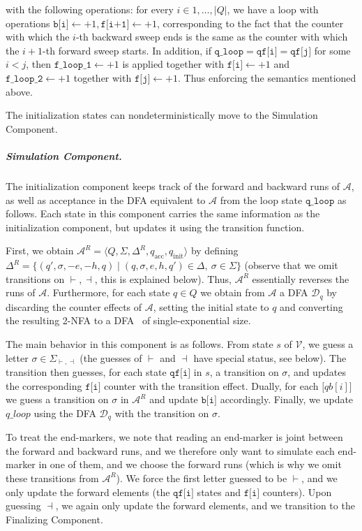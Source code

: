 \documentclass[11pt,a4paper]{amsart}
\theoremstyle{definition}
\newcommand{\tup}[1]{\langle #1 \rangle}
\newcommand{\lmark}{\vdash}
\newcommand{\rmark}{\dashv}
\newcommand{\initstate}{q_{\mathrm{init}}}
\newcommand{\accstate}{q_{\mathrm{acc}}}
\newcommand{\adds}[1]{\leftarrow #1}
\newcommand{\vf}[1]{\texttt{#1}}
\newcommand{\cA}{\mathcal{A}}
\newcommand{\cD}{\mathcal{D}}
\newcommand{\cV}{\mathcal{V}}
\begin{document}
with the following operations: for every $i\in 1,\ldots ,|Q|$, we have a loop with
operations $\vf{b[i]}\adds{+1},\vf{f[i+1]}\adds{+1}$, corresponding to the fact
that the counter with which the $i$-th backward sweep ends is the same as the
counter with which the $i+1$-th forward sweep starts.  In addition, if
$\vf{q\_loop}=\vf{qf[i]}=\vf{qf[j]}$ for some $i<j$, then
$\vf{f\_loop\_1}\adds{+1}$ is applied together with $\vf{f[i]}\adds{+1}$ and
$\vf{f\_loop\_2}\adds{+1}$ together with $\vf{f[j]}\adds{+1}$. Thus enforcing
the semantics mentioned above.

The initialization states can nondeterministically move to the Simulation
Component.
\subparagraph*{Simulation Component.} The initialization component keeps track
of the forward and backward runs of $\cA$, as well as acceptance in the DFA
equivalent to $\cA$ from the loop state $\vf{q\_loop}$ as follows.  Each state
in this component carries the same information as the initialization component,
but updates it using the transition function.

First, we obtain $\cA^R=\tup{Q,\Sigma,\Delta^R,\accstate,\initstate}$ by defining
$\Delta^R=\{(q',\sigma,-e,-h,q)\mid (q,\sigma,e,h,q')\in \Delta,\ \sigma\in \Sigma\}$ (observe that we omit
transitions on $\lmark,\rmark$, this is explained below).  Thus, $\cA^R$
essentially reverses the runs of $\cA$.  Furthermore, for each state $q\in Q$ we
obtain from $\cA$ a DFA $\cD_q$ by discarding the counter effects of $\cA$,
setting the initial state to $q$ and converting the resulting 2-NFA to a
DFA~\cite{shepherdson1959reduction,rabin1959finite,vardi1989note} of
single-exponential size.

The main behavior in this component is as follows. From state $s$ of $\cV$, we
guess a letter $\sigma\in \Sigma_{\lmark,\rmark}$ (the guesses of $\lmark$ and $\rmark$ have
special status, see below).  The transition then guesses, for each state
$\vf{qf[i]}$ in $s$, a transition on $\sigma$, and updates the corresponding
$\vf{f[i]}$ counter with the transition effect. Dually, for each $\vf[qb[i]]$ we
guess a transition on $\sigma$ in $\cA^R$ and update $\vf{b[i]}$ accordingly.
Finally, we update $q\_loop$ using the DFA $\cD_q$ with the transition on $\sigma$.

To treat the end-markers, we note that reading an end-marker is joint between
the forward and backward runs, and we therefore only want to simulate each
end-marker in one of them, and we choose the forward runs (which is why we omit
these transitions from $\cA^R$).  We force the first letter guessed to be
$\lmark$, and we only update the forward elements (the $\vf{qf[i]}$ states and
$\vf{f[i]}$ counters).  Upon guessing $\rmark$, we again only update the forward
elements, and we transition to the Finalizing Component.
\end{document}
